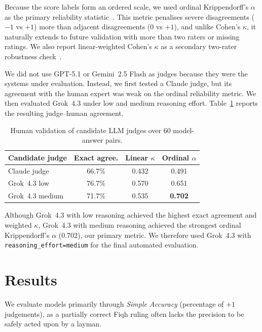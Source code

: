 \documentclass[runningheads]{llncs}
\begin{document}
Because the score labels form an ordered scale, we used ordinal Krippendorff's $\alpha$ as the primary reliability statistic~\cite{krippendorff2011computing}. This metric penalises severe disagreements ($-1$ vs $+1$) more than adjacent disagreements ($0$ vs $+1$), and unlike Cohen's $\kappa$, it naturally extends to future validation with more than two raters or missing ratings. We also report linear-weighted Cohen's $\kappa$ as a secondary two-rater robustness check~\cite{cohen1968weighted}.

We did not use GPT-5.1 or Gemini~2.5 Flash as judges because they were the systems under evaluation. Instead, we first tested a Claude judge, but its agreement with the human expert was weak on the ordinal reliability metric. We then evaluated Grok~4.3 under low and medium reasoning effort. Table~\ref{tab:judge-validation} reports the resulting judge--human agreement.

\begin{table}[t]
\centering
\caption{Human validation of candidate LLM judges over 60 model-answer pairs.}
\label{tab:judge-validation}
\setlength{\tabcolsep}{4pt}
\footnotesize
\begin{tabular}{lccc}
\toprule
\textbf{Candidate judge} & \textbf{Exact agree.} & \textbf{Linear $\kappa$} & \textbf{Ordinal $\alpha$} \\
\midrule
Claude judge       & 66.7\% & 0.432 & 0.491 \\
Grok~4.3 low       & 76.7\% & 0.570 & 0.651 \\
Grok~4.3 medium    & 71.7\% & 0.535 & \textbf{0.702} \\
\bottomrule
\end{tabular}
\end{table}

Although Grok~4.3 with low reasoning achieved the highest exact agreement and weighted $\kappa$, Grok~4.3 with medium reasoning achieved the strongest ordinal Krippendorff's $\alpha$ ($0.702$), our primary metric. We therefore used Grok~4.3 with \texttt{reasoning\_effort=medium} for the final automated evaluation.

\section{Results}

We evaluate models primarily through \emph{Simple Accuracy} (percentage of $+1$ judgements), as a partially correct Fiqh ruling often lacks the precision to be safely acted upon by a layman.
\end{document}
